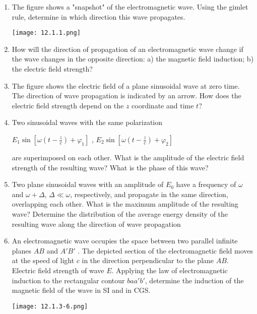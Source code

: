 \documentclass{article}
\begin{document}
\begin{enumerate}[label=12.1.\arabic*]

\item The figure shows a "snapshot" of the electromagnetic wave. Using the gimlet rule, determine in which direction this wave propagates.

\begin{center}
    \texttt{[image: 12.1.1.png]}
\end{center}

\item How will the direction of propagation of an electromagnetic wave change if the wave changes in the opposite direction: a) the magnetic field induction; b) the electric field strength?

\item The figure shows the electric field of a plane sinusoidal wave at zero time. The direction of wave propagation is indicated by an arrow. How does the electric field strength depend on the $z$ coordinate and time $t$?

\item Two sinusoidal waves with the same polarization 

$E_1 \sin [\omega (t - \frac{z}{c}) + \varphi_1]$ , $E_2 \sin[ \omega (t - \frac{z}{c}) + \varphi_2]$

are superimposed on each other. What is the amplitude of the electric field strength of the resulting wave? What is the phase of this wave?

\item Two plane sinusoidal waves with an amplitude of $E_0$ have a frequency of $\omega$ and $\omega + \Delta$, $\Delta \ll \omega$, respectively, and propagate in the same direction, overlapping each other. What is the maximum amplitude of the resulting wave? Determine the distribution of the average energy density of the resulting wave along the direction of wave propagation

\item An electromagnetic wave occupies the space between two parallel infinite planes $AB$ and $A'B'$ . The depicted section of the electromagnetic field moves at the speed of light $c$ in the direction perpendicular to the plane $AB$. Electric field strength of wave $E$. Applying the law of electromagnetic induction to the rectangular contour $b a a'b'$, determine the induction of the magnetic field of the wave in SI and in CGS.

\begin{center}
    \texttt{[image: 12.1.3-6.png]}
\end{center}



\end{enumerate}
\end{document}
